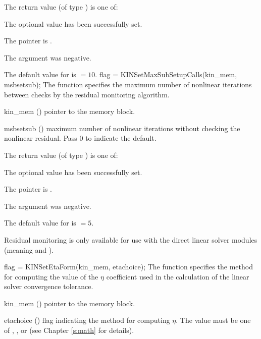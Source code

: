 {
  The return value  (of type ) is one of:
  \begin{args}
  \item[\Id{KIN\_SUCCESS}] 
    The optional value has been successfully set.
  \item[\Id{KIN\_MEM\_NULL}]
    The  pointer is .
  \item[\Id{KIN\_ILL\_INPUT}]
    The argument  was negative.
  \end{args}
}
{
  The default value for  is  $=10$.
}
{
flag = KINSetMaxSubSetupCalls(kin\_mem, msbsetsub);
}
{
  The function  specifies the maximum number of 
  nonlinear iterations between checks by the residual monitoring algorithm.
}
{
  \begin{args}
  \item[kin\_mem] ()
    pointer to the {\kinsol} memory block.
  \item[msbsetsub] ()
    maximum number of nonlinear iterations without checking the
    nonlinear residual.  Pass 0 to indicate the default.
  \end{args}
}
{
  The return value  (of type ) is one of:
  \begin{args}
  \item[\Id{KIN\_SUCCESS}] 
    The optional value has been successfully set.
  \item[\Id{KIN\_MEM\_NULL}]
    The  pointer is .
  \item[\Id{KIN\_ILL\_INPUT}]
    The argument  was negative.
  \end{args}
}
{
  The default value for  is  $=5$.

  {\warn}Residual monitoring is only available for use with the direct linear solver
  modules (meaning {\kindense} and {\kinband}).
}
{
flag = KINSetEtaForm(kin\_mem, etachoice);
}
{
  The function  specifies the method for computing
  the value of the $\eta$ coefficient used in the calculation of the
  linear solver convergence tolerance.
}
{
  \begin{args}[etachoice]
  \item[kin\_mem] ()
    pointer to the {\kinsol} memory block.
  \item[etachoice] ()
    flag indicating the method for computing $\eta$. The value must be one
    of , , or 
    (see Chapter \ref{s:math} for details).
  \end{args}
}
